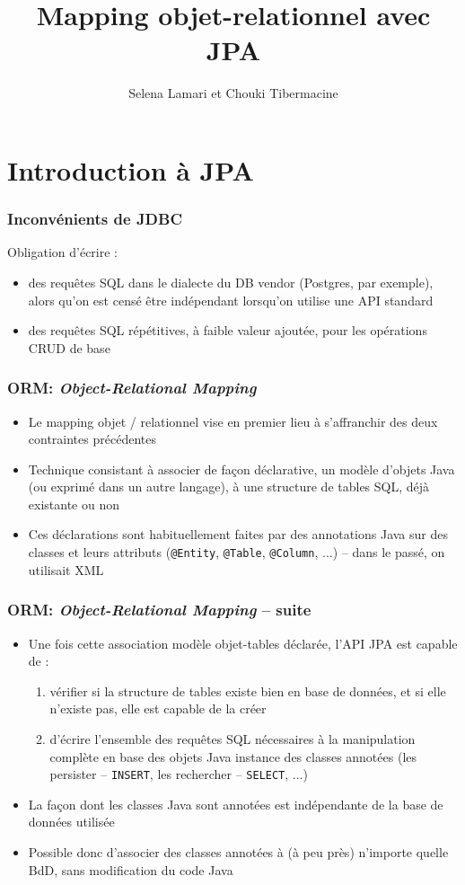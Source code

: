 \documentclass[aspectratio=169,10pt]{beamer}
\title{Mapping objet-relationnel avec JPA}
\author[C. Tibermacine]{Selena Lamari et Chouki Tibermacine}
\date{}
\begin{document}
	


\section{Introduction à JPA}

\begin{frame}
	\frametitle{Inconvénients de JDBC}
	Obligation d'écrire :
	\begin{itemize}
		\item des requêtes SQL dans le dialecte du DB vendor (Postgres, par exemple), alors qu'on est censé être indépendant lorsqu'on utilise une API standard
		\item des requêtes SQL répétitives, à faible valeur ajoutée, pour les opérations CRUD de base
	\end{itemize}
\end{frame}

\begin{frame}
	\frametitle{ORM: \textit{Object-Relational Mapping}}
	
	\begin{itemize}
		\item Le mapping objet / relationnel vise en premier lieu à s'affranchir des deux contraintes précédentes
		\item Technique consistant à associer de façon déclarative, un modèle d'objets Java (ou exprimé dans un autre langage), à une structure de tables SQL, déjà existante ou non
		\item Ces déclarations sont habituellement faites par des annotations Java sur des classes et leurs attributs (\texttt{@Entity}, \texttt{@Table}, \texttt{@Column}, ...) -- dans le passé, on utilisait XML
		
	\end{itemize}
\end{frame}

\begin{frame}
\frametitle{ORM: \textit{Object-Relational Mapping} -- suite}

\begin{itemize}
		\item  Une fois cette association modèle objet-tables déclarée, l'API JPA est capable de :
		\begin{enumerate}
			\item vérifier si la structure de tables existe bien en base de données, et si elle n'existe pas, elle est capable de la créer
			\item d'écrire l'ensemble des requêtes SQL nécessaires à la manipulation complète en base des objets Java instance des classes annotées (les persister -- \texttt{INSERT}, les rechercher -- \texttt{SELECT}, ...)
		\end{enumerate}
		\item La façon dont les classes Java sont annotées est indépendante de la base de données utilisée
		\item Possible donc d'associer des classes annotées à (à peu près) n'importe quelle BdD, sans modification du code Java
	\end{itemize}
\end{frame}
\end{document}
